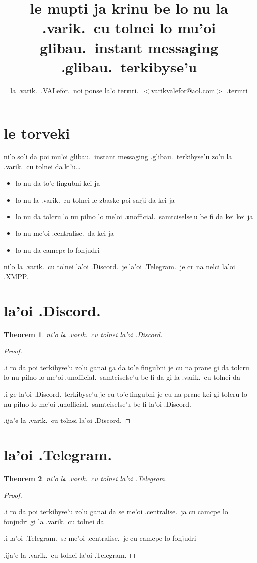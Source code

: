 \documentclass{article}
\title{le mupti ja krinu be lo nu la .varik.\ cu tolnei lo mu'oi glibau.\ instant messaging .glibau.\ terkibyse'u}
\author{la .varik.\ .VALefor.\ noi ponse la'o termri.\ $<$varikvalefor@aol.com$>$ .termri}
\newtheorem{thm}{Theorem}
\begin{document}
\maketitle

\section{le torveki}
ni'o so'i da poi mu'oi glibau.\ instant messaging .glibau.\ terkibyse'u zo'u la .varik.\ cu tolnei da ki'u\ldots
\begin{itemize}
	\item lo nu da to'e fingubni kei ja
	\item lo nu la .varik.\ cu tolnei le zbaske poi sarji da kei ja
	\item lo nu da tolcru lo nu pilno lo me'oi .unofficial.\ samtciselse'u be fi da kei kei ja
	\item lo nu me'oi .centralise.\ da kei ja
	\item lo nu da camcpe lo fonjudri
\end{itemize}

ni'o la .varik.\ cu tolnei la'oi .Discord.\ je la'oi .Telegram.\ je cu na nelci la'oi .XMPP.
\section{la'oi .Discord.}
\begin{thm}
	ni'o la .varik.\ cu tolnei la'oi .Discord.
\end{thm}
\begin{proof}
	${}$

	.i ro da poi terkibyse'u zo'u ganai ga da to'e fingubni je cu na prane gi da tolcru lo nu pilno lo me'oi .unofficial.\ samtciselse'u be fi da gi la .varik.\ cu tolnei da

	.i ge la'oi .Discord.\ terkibyse'u je cu to'e fingubni je cu na prane kei gi tolcru lo nu pilno lo me'oi .unofficial.\ samtciselse'u be fi la'oi .Discord.

	.ija'e la .varik.\ cu tolnei la'oi .Discord.
\end{proof}

\section{la'oi .Telegram.}
\begin{thm}
	ni'o la .varik.\ cu tolnei la'oi .Telegram.
\end{thm}
\begin{proof}
	${}$

	.i ro da poi terkibyse'u zo'u ganai da se me'oi .centralise.\ ja cu camcpe lo fonjudri gi la .varik.\ cu tolnei da

	.i la'oi .Telegram.\ se me'oi .centralise.\ je cu camcpe lo fonjudri

	.ija'e la .varik.\ cu tolnei la'oi .Telegram.
\end{proof}
\end{document}
